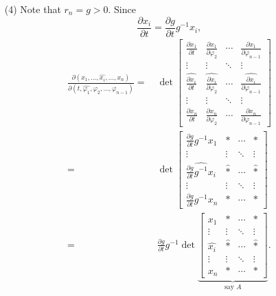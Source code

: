 \documentclass{article}
\begin{document}
\begin{enumerate}
\item[(4)]
  Note that $r_n = g > 0$.
  Since
  \[
    \frac{\partial x_i}{\partial t}
    = \frac{\partial g}{\partial t} g^{-1} x_i,
  \]
  \begin{align*}
    \frac{\partial(x_1,\ldots,\widehat{x_i},\ldots,x_n)}
      {\partial(t,\widehat{\varphi_1}, \varphi_2,\ldots,\varphi_{n-1})}
    =& \: \det
    \begin{bmatrix}
      \frac{\partial x_1}{\partial t}
        & \frac{\partial x_1}{\partial \varphi_2}
        & \cdots
        & \frac{\partial x_1}{\partial \varphi_{n-1}} \\
      \vdots & \vdots & \ddots & \vdots \\
      \widehat{\frac{\partial x_i}{\partial t}}
        & \widehat{\frac{\partial x_i}{\partial \varphi_2}}
        & \cdots
        & \widehat{\frac{\partial x_i}{\partial \varphi_{n-1}}} \\
      \vdots & \vdots & \ddots & \vdots \\
      \frac{\partial x_n}{\partial t}
        & \frac{\partial x_n}{\partial \varphi_2}
        & \cdots
        & \frac{\partial x_n}{\partial \varphi_{n-1}}
    \end{bmatrix} \\
    =& \:
    \det
    \begin{bmatrix}
      \frac{\partial g}{\partial t} g^{-1} x_1
        & *
        & \cdots
        & * \\
      \vdots & \vdots & \ddots & \vdots \\
      \widehat{\frac{\partial g}{\partial t} g^{-1} x_i}
        & \widehat{*}
        & \cdots
        & \widehat{*} \\
      \vdots & \vdots & \ddots & \vdots \\
      \frac{\partial g}{\partial t} g^{-1} x_n
        & *
        & \cdots
        & *
    \end{bmatrix} \\
    =& \:
    \frac{\partial g}{\partial t} g^{-1}
    \det
    \underbrace{\begin{bmatrix}
      x_1
        & *
        & \cdots
        & * \\
      \vdots & \vdots & \ddots & \vdots \\
      \widehat{x_i}
        & \widehat{*}
        & \cdots
        & \widehat{*} \\
      \vdots & \vdots & \ddots & \vdots \\
      x_n
        & *
        & \cdots
        & *
    \end{bmatrix}}_{\text{say $A$}}.

\end{align*}
\end{enumerate}
\end{document}
